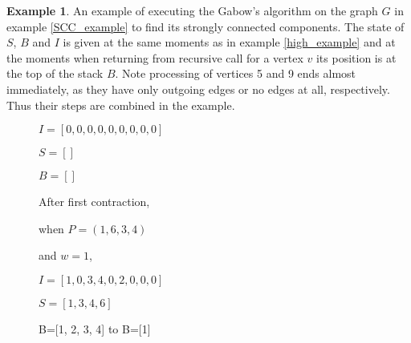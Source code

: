 \documentclass{report}
\theoremstyle{plain}
\theoremstyle{definition}
\newtheorem{example}{Example}
\theoremstyle{remark}
\numberwithin{definition}{chapter}
\numberwithin{example}{chapter}
\numberwithin{figure}{chapter}
\begin{document}
\begin{example}

An example of executing the Gabow's algorithm on the graph $G$ in example \ref{SCC_example} to find its strongly connected components. The state of $S$, $B$ and $I$ is given at the same moments as in example \ref{high_example} and at the moments when  
returning from recursive call for a vertex $v$ its position is at the top of the stack $B$. Note processing of vertices 5 and 9 ends almost immediately, as they have only outgoing edges or no edges at all, respectively. Thus their steps are combined in the example.

\begin{figure}[h]

\begin{minipage}[h]{0.24\textwidth}

$I=[0, 0, 0, 0, 0, 0, 0, 0, 0]$

$S=[]$

$B=[]$

\end{minipage}
\hfill
{}

After first contraction,

when $P=(1,6,3,4)$

and $w=1$,

$I=[1, 0, 3, 4, 0, 2, 0, 0, 0]$

$S=[1, 3, 4, 6]$

B=[1, 2, 3, 4] to B=[1]
\endminipage\hfill
{}


\end{figure}
\end{example}
\end{document}
